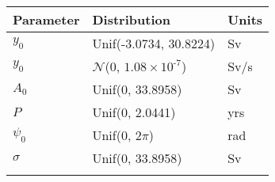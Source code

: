 \begin{tabular}{lll} \hhline{===}
        Parameter & Distribution &  Units\\ \hline
$y_0$ & Unif(\textrm{-}3.0734, 30.8224) & Sv\\
$y_0$ & $\mathcal{N}$(0, ${1.08}\times 10^{\textrm{-}7}$) & Sv/s\\
$A_0$ & Unif(0, 33.8958) & Sv\\
$P$ & Unif(0, 2.0441) & yrs\\
$\psi_0$ & Unif(0, $2\pi$) & rad\\
$\sigma$ & Unif(0, 33.8958) & Sv\\
\hhline{===}
\end{tabular}